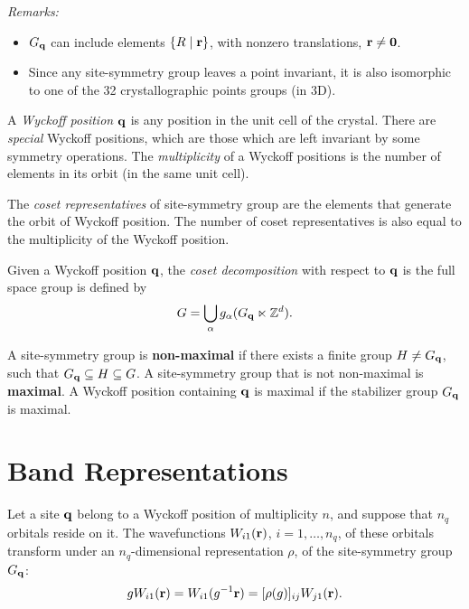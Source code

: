 \textit{Remarks:}
\begin{itemize}
\item $G_{\vb{q}}$ can include elements $\{R \mid {\vb{r}}\}$, with nonzero translations, ${\vb{r}} \neq {\vb{0}}$.
\item Since any site-symmetry group leaves a point invariant, it is also isomorphic to one of the 32 crystallographic points groups (in 3D).
\end{itemize}

\begin{definition} \label{def:wyckpos}
A \textit{Wyckoff position} ${\vb{q}}$ is any position in the unit cell of the crystal. There are \textit{special} Wyckoff positions, which are those which are left invariant by some symmetry operations. The \textit{multiplicity} of a Wyckoff positions is the number of elements in its orbit (in the same unit cell).
\end{definition}

\begin{definition} \label{def:cosetrep}
The \textit{coset representatives} of site-symmetry group are the elements that generate the orbit of Wyckoff position. The number of coset representatives is also equal to the multiplicity of the Wyckoff position.
\end{definition}

\begin{definition} \label{def:cosetdecomp}
Given a Wyckoff position ${\vb{q}}$, the \textit{coset decomposition} with respect to ${\vb{q}}$ is the full space group is defined by
$$
G = \bigcup_\alpha g_\alpha (G_{{\vb{q}}} \ltimes {\mathbb{Z}}^d).
$$
\end{definition}

\begin{definition}
A site-symmetry group is \textbf{non-maximal} if there exists a finite group $H \neq G_{\vb{q}}$, such that $G_{\vb{q}} \subseteq H \subseteq G$. A site-symmetry group that is not non-maximal is \textbf{maximal}. A Wyckoff position containing ${\vb{q}}$ is maximal if the stabilizer group $G_{\vb{q}}$ is maximal.
\end{definition}

\section{Band Representations}

Let a site ${\vb{q}}$ belong to a Wyckoff position of multiplicity $n$, and suppose that $n_q$ orbitals reside on it. The wavefunctions $W_{i1}({\vb{r}})$, $i = 1, \ldots, n_q$, of these orbitals transform under an $n_q$-dimensional representation $\rho$, of the site-symmetry group $G_{\vb{q}}$:
$$
g W_{i1}({\vb{r}}) = W_{i1}(g^{-1} {\vb{r}}) = [\rho(g)]_{ij} W_{j1}({\vb{r}}).
$$

